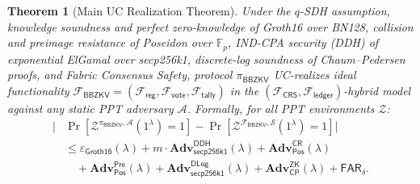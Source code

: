\documentclass[10pt,letterpaper,journal]{IEEEtran}
\newtheorem{theorem}{Theorem}[section]
\begin{document}
\begin{theorem}[Main UC Realization Theorem]
\label{thm:main-uc}
Under the $q$-SDH assumption, knowledge soundness and perfect zero-knowledge of Groth16 over BN128, collision and preimage resistance of Poseidon over $\mathbb{F}_p$, IND-CPA security (DDH) of exponential ElGamal over secp256k1, discrete-log soundness of Chaum--Pedersen proofs, and Fabric Consensus Safety, protocol $\pi_{\mathsf{BBZKV}}$ UC-realizes ideal functionality $\mathcal{F}_{\mathsf{BBZKV}} = (\mathcal{F}_{\mathsf{reg}}, \mathcal{F}_{\mathsf{vote}}, \mathcal{F}_{\mathsf{tally}})$ in the $(\mathcal{F}_{\mathsf{CRS}}, \mathcal{F}_{\mathsf{ledger}})$-hybrid model against any static PPT adversary $\mathcal{A}$. Formally, for all PPT environments $\mathcal{Z}$:
\begin{equation}
\label{eq:main-uc-bound}
\begin{split}
  \bigl| &\Pr[\mathcal{Z}^{\pi_{\mathsf{BBZKV}}, \mathcal{A}}(1^\lambda) = 1] - \Pr[\mathcal{Z}^{\mathcal{F}_{\mathsf{BBZKV}}, \mathcal{S}}(1^\lambda) = 1] \bigr| \\
  &\leq \varepsilon_{\mathsf{Groth16}}(\lambda) + m \cdot \mathbf{Adv}_{\mathsf{secp256k1}}^{\mathsf{DDH}}(\lambda) + \mathbf{Adv}_{\mathsf{Pos}}^{\mathsf{CR}}(\lambda) \\
  &\quad + \mathbf{Adv}_{\mathsf{Pos}}^{\mathsf{Pre}}(\lambda) + \mathbf{Adv}_{\mathsf{secp256k1}}^{\mathsf{DLog}}(\lambda) + \mathbf{Adv}_{\mathsf{CP}}^{\mathsf{ZK}}(\lambda) + \mathsf{FAR}_\delta.
\end{split}
\end{equation}
\end{theorem}
\end{document}
